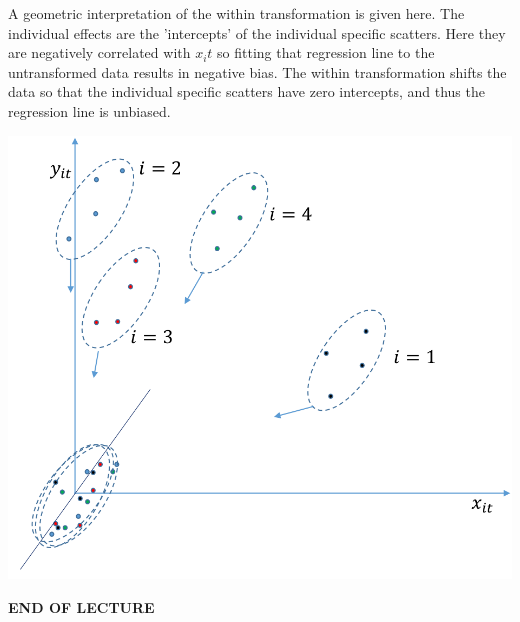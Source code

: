 \documentclass[DIV=14,titlepage=false]{scrreprt}
\begin{document}
\begin{minipage}[c]{0.5\textwidth} 
    A geometric interpretation of the within transformation is given here. The individual effects are the 'intercepts' of the individual specific scatters. Here they are negatively correlated with $x_it$ so fitting that regression line to the untransformed data results in negative bias. The within transformation shifts the data so that the individual specific scatters have zero intercepts, and thus the regression line is unbiased.
\end{minipage}
\hfill
\begin{minipage}[c]{0.45\textwidth}
    \includegraphics[width=\textwidth]{./Images/fixedeffects.png}
\end{minipage}

\textbf{END OF LECTURE}
\end{document}
